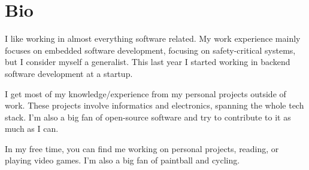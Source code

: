 \documentclass[letterpaper]{twentysecondcv} %
\begin{document}








\makeprofile %

\vfill


\section{Bio}

I like working in almost everything software related. My work experience mainly focuses
on embedded software development, focusing on safety-critical systems, but I consider
myself a generalist. This last year I started working in backend software development
at a startup.

I get most of my knowledge/experience from my personal projects outside of work. These
projects involve informatics and electronics, spanning the whole tech stack. I'm also
a big fan of open-source software and try to contribute to it as much as I can.

In my free time, you can find me working on personal projects, reading, or playing
video games. I'm also a big fan of paintball and cycling.
\end{document}
